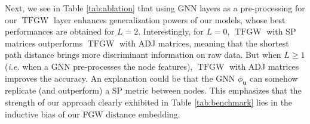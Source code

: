 \documentclass{article}
\def\vu{{\bm{u}}}
\newcommand{\TFGW}{\operatorname{TFGW}}
\begin{document}
Next, we see in Table \ref{tab:ablation} that using GNN layers as a
pre-processing for our $\TFGW$ layer enhances generalization powers of our models,
whose best performances are obtained for $L=2$. Interestingly, for $L=0$,
$\TFGW$ with SP
matrices outperforms $\TFGW$ with ADJ matrices, meaning that the shortest path
distance brings more discriminant information on raw data. But when
$L\geq 1$ (\textit{i.e.} when a GNN pre-processes the node features), $\TFGW$ with ADJ matrices improves the accuracy. 
An explanation could be that the GNN $\phi_{\vu}$ can somehow replicate (and  outperform) a SP metric between nodes. This emphasizes that the strength of our approach clearly exhibited in Table \ref{tab:benchmark} lies in the inductive bias of our FGW distance embedding.
\end{document}
